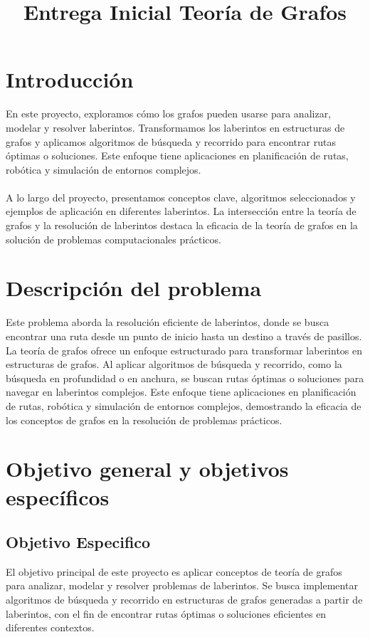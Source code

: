 \documentclass[conference]{IEEEtran}
\title{Entrega Inicial Teoría de Grafos}
\author{
	\IEEEauthorblockN{Juan Sebastian Pedraza Guevara }
	\IEEEauthorblockA{\textit{Escuela de Ingeniería Ciencia y Tecnología} \\
		\textit{Matemáticas Aplicadas y Ciencias de la Computación}\\
		\textit{Universidad del Rosario}\\
		Bogotá , Colombia\\
	}
	
	
}
\begin{document}
	
	\maketitle
	
	
	\section{Introducción}
	En este proyecto, exploramos cómo los grafos pueden usarse para analizar, modelar y resolver laberintos. Transformamos los laberintos en estructuras de grafos y aplicamos algoritmos de búsqueda y recorrido para encontrar rutas óptimas o soluciones. Este enfoque tiene aplicaciones en planificación de rutas, robótica y simulación de entornos complejos. 
	\\ 
	\\
	A lo largo del proyecto, presentamos conceptos clave, algoritmos seleccionados y ejemplos de aplicación en diferentes  laberintos. La intersección entre la teoría de grafos y la resolución de laberintos destaca la eficacia de la teoría de grafos en la solución de problemas computacionales prácticos.
	
	\section{Descripción del problema}
	Este problema aborda la resolución eficiente de laberintos, donde se busca encontrar una ruta desde un punto de inicio hasta un destino a través de pasillos. La teoría de grafos ofrece un enfoque estructurado para transformar laberintos en estructuras de grafos. Al aplicar algoritmos de búsqueda y recorrido, como la búsqueda en profundidad o en anchura, se buscan rutas óptimas o soluciones para navegar en laberintos complejos. Este enfoque tiene aplicaciones en planificación de rutas, robótica y simulación de entornos complejos, demostrando la eficacia de los conceptos de grafos en la resolución de problemas prácticos.
	\section{Objetivo general y objetivos específicos}
	\subsection{Objetivo Especifico}
	El objetivo principal de este proyecto es aplicar conceptos de teoría de grafos para analizar, modelar y resolver problemas de laberintos. Se busca implementar algoritmos de búsqueda y recorrido en estructuras de grafos generadas a partir de laberintos, con el fin de encontrar rutas óptimas o soluciones eficientes en diferentes contextos.
	\\
	\\
\end{document}
